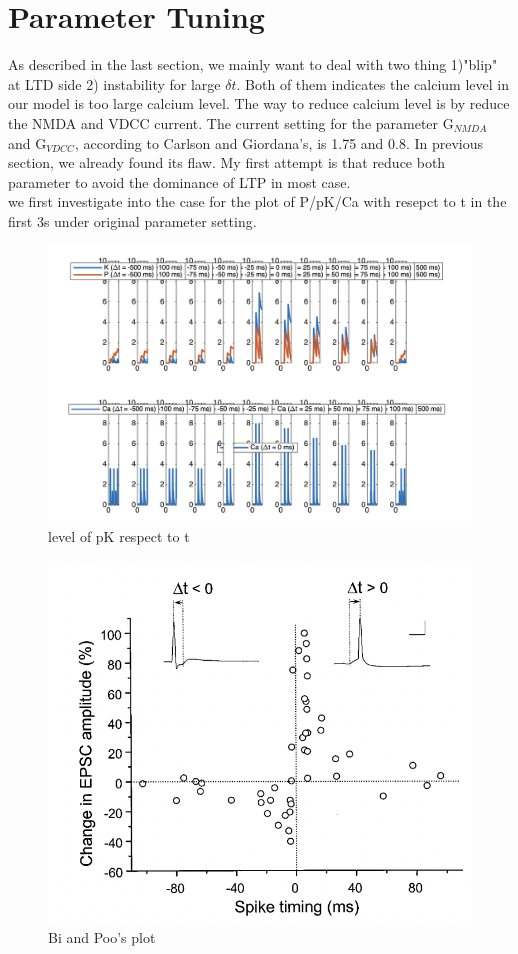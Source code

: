 \documentclass{article}
\begin{document}
\newpage
\section{Parameter Tuning}
As described in the last section, we mainly want to deal with two thing 1)"blip" at LTD side 2) instability for large $\delta t$. Both of them indicates the calcium level in our model is too large calcium level. The way to reduce calcium level is by reduce the NMDA and VDCC current. The current setting for the parameter G$_{NMDA}$ and G$_{VDCC}$, according to Carlson and Giordana's, is 1.75 and 0.8. In previous section, we already found its flaw. My first attempt is that reduce both parameter to avoid the dominance of LTP in most case.\\
\linebreak
we first investigate into the case for the plot of P/pK/Ca with resepct to t in the first 3s under original parameter setting. 
\begin{figure}[ht]
    \centering
    \includegraphics[width=.8\linewidth]{3.png}
    \caption{level of pK respect to t}
    \label{fig:fig4}
\end{figure}

\begin{figure}[ht]
    \centering
    \includegraphics[width=.47\linewidth]{5.png}
    \caption{Bi and Poo's plot}
    \label{fig:fig5}
\end{figure}
\end{document}
